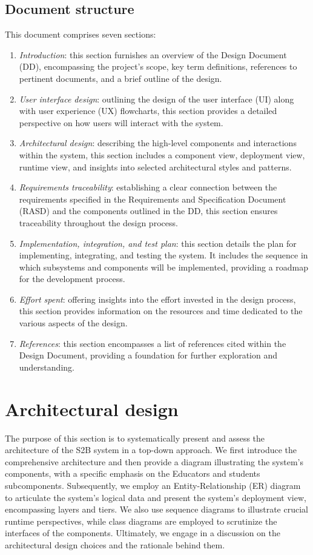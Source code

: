 \documentclass[12pt, a4paper]{report}
\begin{document}
    \section{Document structure}
    This document comprises seven sections:
    \begin{enumerate}
        \item \textit{Introduction}: this section furnishes an overview of the Design Document (DD), encompassing the project's scope, key term definitions, references to pertinent documents, and a brief outline of the design. 
        \item \textit{User interface design}: outlining the design of the user interface (UI) along with user experience (UX) flowcharts, this section provides a detailed perspective on how users will interact with the system. 
        \item \textit{Architectural design}: describing the high-level components and interactions within the system, this section includes a component view, deployment view, runtime view, and insights into selected architectural styles and patterns.
        \item \textit{Requirements traceability}: establishing a clear connection between the requirements specified in the Requirements and Specification Document (RASD) and the components outlined in the DD, this section ensures traceability throughout the design process.
        \item \textit{Implementation, integration, and test plan}: this section details the plan for implementing, integrating, and testing the system. 
            It includes the sequence in which subsystems and components will be implemented, providing a roadmap for the development process.
        \item \textit{Effort spent}: offering insights into the effort invested in the design process, this section provides information on the resources and time dedicated to the various aspects of the design.                 
        \item \textit{References}: this section encompasses a list of references cited within the Design Document, providing a foundation for further exploration and understanding.
    \end{enumerate}   

\newpage 

\chapter{Architectural design}
    The purpose of this section is to systematically present and assess the architecture of the S2B system in a top-down approach. 
    We first introduce the comprehensive architecture and then provide a diagram illustrating the system's components, with a specific emphasis on the Educators and students subcomponents. 
    Subsequently, we employ an Entity-Relationship (ER) diagram to articulate the system's logical data and present the system's deployment view, encompassing layers and tiers. 
    We also use sequence diagrams to illustrate crucial runtime perspectives, while class diagrams are employed to scrutinize the interfaces of the components. 
    Ultimately, we engage in a discussion on the architectural design choices and the rationale behind them.
\end{document}
